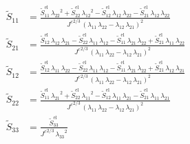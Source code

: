 \begin{align}
\tilde{S}_{11} &= \frac{\tilde{S}_{11}^{\mathrm{el}}\,{\lambda _{22}}^2+\tilde{S}_{22}^{\mathrm{el}}\,{\lambda _{12}}^2-\tilde{S}_{12}^{\mathrm{el}}\,\lambda _{12}\,\lambda _{22}-\tilde{S}_{21}^{\mathrm{el}}\,\lambda _{12}\,\lambda _{22}}{{J^{c}}^{2/3}\,{\left(\lambda _{11}\,\lambda _{22}-\lambda _{12}\,\lambda _{21}\right)}^2} \\ 
\tilde{S}_{21} &= \frac{\tilde{S}_{12}^{\mathrm{el}}\,\lambda _{12}\,\lambda _{21}-\tilde{S}_{22}^{\mathrm{el}}\,\lambda _{11}\,\lambda _{12}-\tilde{S}_{11}^{\mathrm{el}}\,\lambda _{21}\,\lambda _{22}+\tilde{S}_{21}^{\mathrm{el}}\,\lambda _{11}\,\lambda _{22}}{{J^{c}}^{2/3}\,{\left(\lambda _{11}\,\lambda _{22}-\lambda _{12}\,\lambda _{21}\right)}^2} \\ 
\tilde{S}_{12} &= \frac{\tilde{S}_{12}^{\mathrm{el}}\,\lambda _{11}\,\lambda _{22}-\tilde{S}_{22}^{\mathrm{el}}\,\lambda _{11}\,\lambda _{12}-\tilde{S}_{11}^{\mathrm{el}}\,\lambda _{21}\,\lambda _{22}+\tilde{S}_{21}^{\mathrm{el}}\,\lambda _{12}\,\lambda _{21}}{{J^{c}}^{2/3}\,{\left(\lambda _{11}\,\lambda _{22}-\lambda _{12}\,\lambda _{21}\right)}^2} \\ 
\tilde{S}_{22} &= \frac{\tilde{S}_{11}^{\mathrm{el}}\,{\lambda _{21}}^2+\tilde{S}_{22}^{\mathrm{el}}\,{\lambda _{11}}^2-\tilde{S}_{12}^{\mathrm{el}}\,\lambda _{11}\,\lambda _{21}-\tilde{S}_{21}^{\mathrm{el}}\,\lambda _{11}\,\lambda _{21}}{{J^{c}}^{2/3}\,{\left(\lambda _{11}\,\lambda _{22}-\lambda _{12}\,\lambda _{21}\right)}^2} \\ 
\tilde{S}_{33} &= \frac{\tilde{S}_{33}^{\mathrm{el}}}{{J^{c}}^{2/3}\,{\lambda _{33}}^2} 
\end{align}
